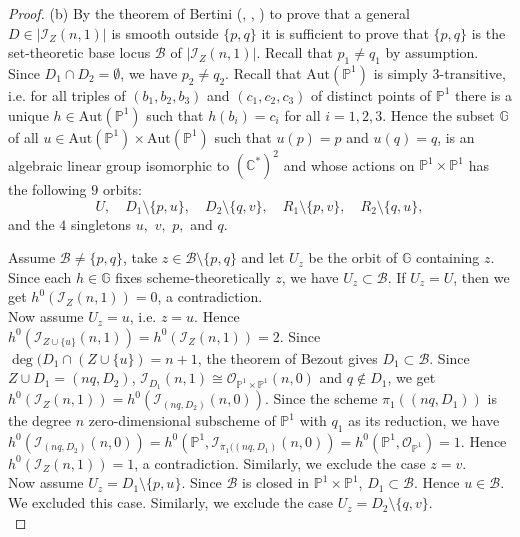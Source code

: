 \documentclass[
  a4paper, 
  reqno, 
  oneside, 
  11pt
]{amsart}
\theoremstyle{plain}	%
\theoremstyle{mydef} %
\theoremstyle{remark}
\theoremstyle{definition}
\theoremstyle{remark}
\begin{document}
\begin{proof}
 {(b)} By the theorem of Bertini  (\cite[p. 137]{GH}, \cite[III.10.9]{h}, \cite[6.3]{jou}) to prove that a general $D\in |\mathcal I_Z(n,1)|$ is smooth outside $\{p,q\}$ it is sufficient to prove that $\{p,q\}$ is the set-theoretic base locus $\mathcal B$ of $|\mathcal I_Z(n,1)|$. Recall that $p_1\ne q_1$ by assumption. Since $D_1\cap  D_2 =\emptyset$, we have $p_2\ne q_2$. Recall that $\mathrm{Aut}(\mathbb P^1)$ is simply $3$-transitive, i.e. for all triples
of $(b_1,b_2,b_3)$ and $(c_1,c_2,c_3)$ of distinct points of $\mathbb P^1$ there is a unique $h\in \mathrm{Aut}(\mathbb P^1)$ such that $h(b_i)=c_i$ for all $i=1,2,3$.
Hence the subset $\mathbb G$ of all $u\in \mathrm{Aut}(\mathbb P^1)\times \mathrm{Aut}(\mathbb P^1)$ such that $u(p)=p$ and $u(q) =q$, is an algebraic linear group isomorphic
to $(\mathbb C^\ast)^2$ and whose actions on $\mathbb P^1\times \mathbb P^1$ has the following $9$ orbits: 
$$U, \quad  D_1\setminus \{p,u\}, \quad  D_2\setminus \{q,v\}, \quad R_1\setminus \{p,v\},  
\quad R_2\setminus \{q,u\},$$ and the $4$ singletons $u, \,\, v, \,\,  p, $ and $q$. 

Assume $\mathcal B\ne \{p,q\}$, take $z\in \mathcal B\setminus \{p,q\}$ and let $U_z$ be the orbit of $\mathbb G$ containing $z$. Since each $h\in \mathbb G$ fixes scheme-theoretically $z$, we have $U_z\subset \mathcal B$.
If $U_z=U$, then we get $h^0(\mathcal I_Z(n,1)) =0$, a contradiction. \\

Now assume $U_z=u$, i.e. $z=u$. Hence $h^0(\mathcal I_{Z\cup \{u\}}(n,1)) =h^0(\mathcal I_Z(n,1)) =2$. Since $\deg(D_1\cap (Z\cup \{u\})
=n+1$, the theorem of Bezout gives $D_1\subset \mathcal B$. Since $Z\cup D_1 =(nq,D_2)$, $\mathcal I_{D_1}(n,1)  \cong \mathcal O_{\mathbb P^1\times \mathbb P^1}(n,0)$ and $q\notin D_1$, we get $h^0(\mathcal I_Z(n,1)) =h^0(\mathcal I_{(nq,D_2)}(n,0))$. Since the scheme $\pi_1((nq,D_1))$ is the degree $n$ zero-dimensional subscheme of $\mathbb P^1$ with $q_1$ as its reduction, we have $h^0(\mathcal I_{(nq,D_2)}(n,0))=h^0(\mathbb P^1,\mathcal I_{\pi_1((nq,D_1)}(n,0)) =h^0(\mathbb P^1,\mathcal O_{\mathbb P^1})=1$. 
Hence $h^0(\mathcal I_Z(n,1)) =1$, a contradiction. 
Similarly, we exclude the case $z=v$.\\


Now assume $U_z =D_1\setminus \{p,u\}$. Since $\mathcal B$ is closed in $\mathbb P^1\times \mathbb P^1$,
$D_1\subset \mathcal B$. Hence $u\in \mathcal B$. We excluded this case. Similarly, we exclude the case $U_z = D_2\setminus \{q,v\}$.\\


\end{proof}
\end{document}
